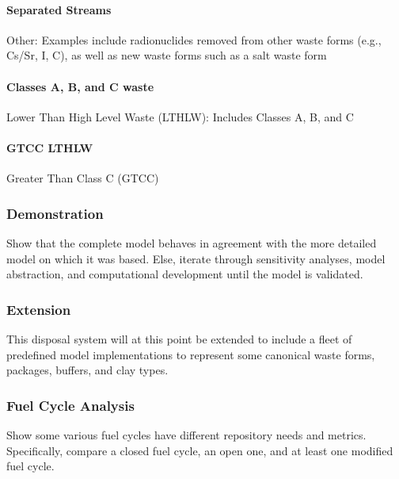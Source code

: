 \paragraph{Separated Streams} Other:  Examples include radionuclides removed 
from other waste forms (e.g., Cs/Sr, I, C), as well as new waste forms such as a 
salt waste form

\paragraph{Classes A, B, and C waste} Lower Than High Level Waste (LTHLW): 
Includes Classes A, B, and C

\paragraph{GTCC LTHLW}  Greater Than Class C (GTCC)


\subsubsection{Demonstration}

Show that the complete model behaves in agreement with the more detailed model 
on which it was based. Else, iterate through sensitivity analyses, model 
abstraction, and computational development until the model is validated. 



\subsubsection{Extension}

This disposal system will at this point be extended to include a fleet of 
predefined model implementations to represent some canonical waste forms, 
packages, buffers, and clay types.  

\subsubsection{Fuel Cycle Analysis}

Show some various fuel cycles have different repository needs and metrics.  
Specifically, compare a closed fuel cycle, an open one, and at least one 
modified fuel cycle. 






